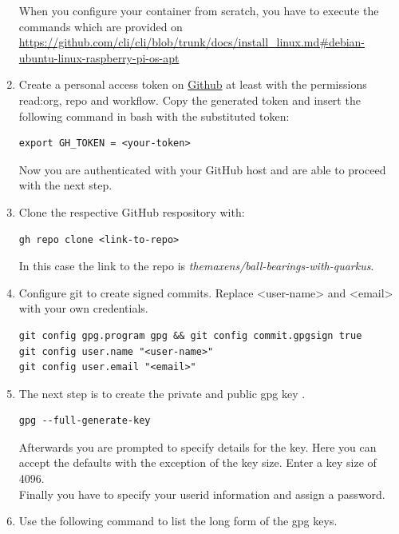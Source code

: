 \begin{enumerate}
        When you configure your container from scratch, you have to execute the commands which are provided on \url{https://github.com/cli/cli/blob/trunk/docs/install_linux.md#debian-ubuntu-linux-raspberry-pi-os-apt}
        \item Create a personal access token on \href{https://github.com/settings/tokens}{Github} at least with the permissions read:org, repo and workflow. Copy the generated token and insert the following command in \ac{bash} with the substituted token: 
            \begin{lstlisting}[style=bash]
export GH_TOKEN = <your-token>
            \end{lstlisting}   
        Now you are authenticated with your GitHub host and are able to proceed with the next step.
        \item Clone the respective GitHub respository with: 
            \begin{lstlisting}[style=bash] 
gh repo clone <link-to-repo>  
            \end{lstlisting} 
            In this case the link to the repo is \textit{themaxens/ball-bearings-with-quarkus}.
        \item Configure git to create signed commits. Replace <user-name> and <email> with your own credentials. 
            \begin{lstlisting}[style=bash] 
git config gpg.program gpg && git config commit.gpgsign true
git config user.name "<user-name>"
git config user.email "<email>"
            \end{lstlisting}
        \item The next step is to create the private and public \ac{gpg} key \autocite[cf.][]{create_gpg}.
            \begin{lstlisting}[style=bash] 
gpg --full-generate-key 
            \end{lstlisting} 
        Afterwards you are prompted to specify details for the key. Here you can accept the defaults with the exception of the key size. Enter a key size of 4096. \\
        Finally you have to specify your userid information and assign a password. 
        \item \label{itm:gpg_key_start} Use the following command to list the long form of the \ac{gpg} keys. 

\end{enumerate}
